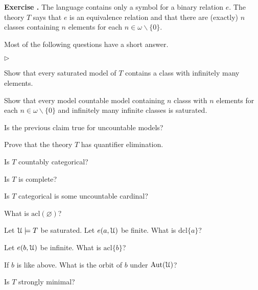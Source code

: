 \documentclass[10pt]{article}
\def\U{\EuScript U}
\def\sm{\smallsetminus}
\def\Aut{\textrm{Aut}}
\def\acl{\textrm{acl}}
\def\dcl{\textrm{dcl}}
\newcommand{\labella}[1]{{\sf\footnotesize #1}\hfill}
\renewenvironment{itemize}
  {\begin{list}{$\triangleright$}{%
   \setlength{\parskip}{0mm}
   \setlength{\topsep}{0mm}
   \setlength{\rightmargin}{0mm}
   \setlength{\listparindent}{0mm}
   \setlength{\itemindent}{0mm}
   \setlength{\labelwidth}{3ex}
   \setlength{\itemsep}{0mm}
   \setlength{\parsep}{0mm}
   \setlength{\partopsep}{0mm}
   \setlength{\labelsep}{1ex}
   \setlength{\leftmargin}{\labelwidth+\labelsep}
   \let\makelabel\labella}}{%
   \end{list}}
\newcounter{ex}
\newenvironment{exercise}{\bigskip\addtocounter{ex}{1}\textbf{Exercise \theex.\quad}}{}
\begin{document}
\begin{exercise}
The language contains only a symbol for a binary relation $e$. The theory $T$ says that $e$ is an equivalence relation and that there are (exactly) $n$ classes containing $n$ elements for each $n\in\omega\sm\{0\}$. 

Most of the following questions have a short answer.

\medskip
\begin{itemize}
\item[1.] Show that every saturated model of $T$ contains a class with infinitely many elements.
\item[2.] Show that every model countable model containing $n$ classs with $n$ elements for each $n\in\omega\sm\{0\}$ and infinitely many infinite classes is saturated.
\item[3.] Is the previous claim true for uncountable models?
\item[4.] Prove that the theory $T$ has quantifier elimination.  
\item[5.]  Is $T$ countably categorical? 
\item[6.] Is $T$ is complete?
\item[7.] Is $T$ categorical is some uncountable cardinal?
\item[8.] What is $\acl(\varnothing)$?
\item[9.] Let $\U\models T$ be saturated. Let $e(a,\U)$ be finite. What is $\dcl\{a\}$?
\item[10.]  Let $e(b,\U)$ be infinite. What is $\acl\{b\}$?
\item[11.] If $b$ is like above. What is the orbit of $b$ under $\Aut(\U)$?
\item[12.] Is $T$ strongly minimal?
\end{itemize}
\end{exercise}
\end{document}
